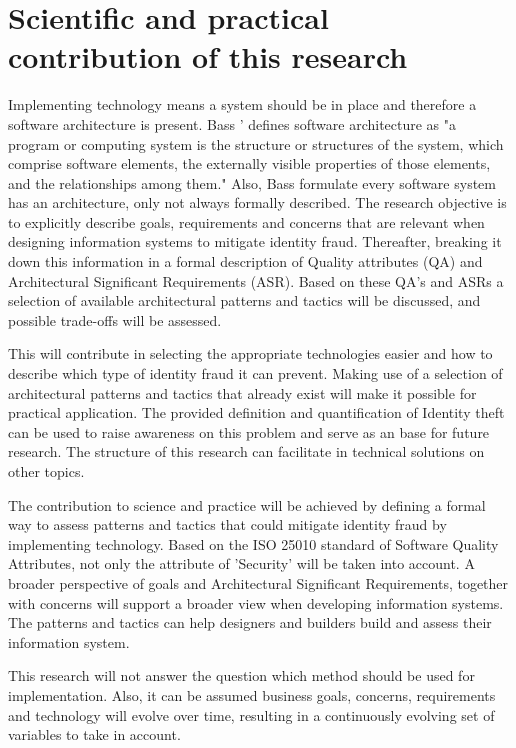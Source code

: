 \section{Scientific and practical contribution of this research}
Implementing technology means a system should be in place and therefore a software architecture is present. Bass '\etal \cite{Bass2015SoftwareAI} defines software architecture as "a program or computing system is the structure or structures of the system, which comprise software elements, the externally visible properties of those elements, and the relationships among them." Also, Bass \etal formulate every software system has an architecture, only not always formally described.
The research objective is to explicitly describe goals, requirements and concerns that are relevant when designing information systems to mitigate identity fraud. Thereafter, breaking it down this information in a formal description of Quality attributes (QA) and Architectural Significant Requirements (ASR). Based on these QA's and ASRs a selection of available architectural patterns and tactics will be discussed, and possible trade-offs will be assessed. 

This will contribute in selecting the appropriate technologies easier and how to describe which type of identity fraud it can prevent. Making use of a selection of architectural patterns and tactics that already exist will make it possible for practical application. The provided definition and quantification of Identity theft can be used to raise awareness on this problem and serve as an base for future research. The structure of this research can facilitate in technical solutions on other topics.

The contribution to science and practice will be achieved by defining a formal way to assess patterns and tactics that could mitigate identity fraud by implementing technology. Based on the ISO 25010 standard of Software Quality Attributes, not only the attribute of 'Security' will be taken into account. A broader perspective of goals and Architectural Significant Requirements, together with concerns will support a broader view when developing information systems. The patterns and tactics can help designers and builders build and assess their information system.

This research will not answer the question which method should be used for implementation. Also, it can be assumed business goals, concerns, requirements and technology will evolve over time, resulting in a continuously evolving set of variables to take in account.



